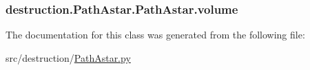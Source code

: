 \hypertarget{classdestruction_1_1_path_astar_1_1_path_astar_a075b130f210377548d5652f38467f9f1}{
\subsubsection[{volume}]{\setlength{\rightskip}{0pt plus 5cm}destruction.\-Path\-Astar.\-Path\-Astar.\-volume}}\label{classdestruction_1_1_path_astar_1_1_path_astar_a075b130f210377548d5652f38467f9f1}


The documentation for this class was generated from the following file\-:\begin{DoxyCompactItemize}
\item 
src/destruction/\hyperlink{_path_astar_8py}{Path\-Astar.\-py}\end{DoxyCompactItemize}
